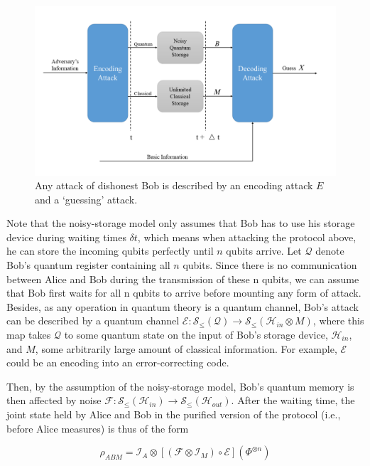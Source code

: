 \begin{definition}
\begin{figure}[!htb]
    \centering
    \includegraphics[scale=0.37]{Images/NSM2.png}
    \caption{Any attack of dishonest Bob is described by an encoding attack $E$ and a ‘guessing’ attack.}
     \label{fig:nsm2}
\end{figure}

Note that the noisy-storage model only assumes that Bob has to use his storage device during waiting times $\delta t$, which means when attacking the protocol above, he can store the incoming qubits perfectly until $n$ qubits arrive. Let $\mathcal{Q}$ denote Bob’s quantum register containing all $n$ qubits. Since there is no communication between Alice and Bob during the transmission of these n qubits, we can assume that Bob first waits for all n qubits to arrive before mounting any form of attack. Besides, as any operation in quantum theory is a quantum channel, Bob’s attack can be described by a quantum channel $\mathcal{E}: \mathcal{S}_{\leq}(\mathcal{Q}) \rightarrow \mathcal{S}_{\leq}(\mathcal{H}_{in} \otimes M)$, where this map takes $\mathcal{Q}$ to some quantum state on the input of Bob's storage device, $\mathcal{H}_{in}$, and $M$, some arbitrarily large amount of classical information. For example, $\mathcal{E}$ could be an encoding into an error-correcting code. 

Then, by the assumption of the noisy-storage model, Bob’s quantum memory is then affected by noise $\mathcal{F}: \mathcal{S}_{\leq}(\mathcal{H}_{in}) \rightarrow \mathcal{S}_{\leq}(\mathcal{H}_{out})$. After the waiting time, the joint state held by Alice and Bob in the purified version of the protocol (i.e., before Alice measures) is thus of the form

$$\rho_{ABM} = \mathcal{I}_A \otimes [(\mathcal{F} \otimes \mathcal{I}_M) \circ \mathcal{E}](\Phi^{\otimes n})$$


\end{definition}
